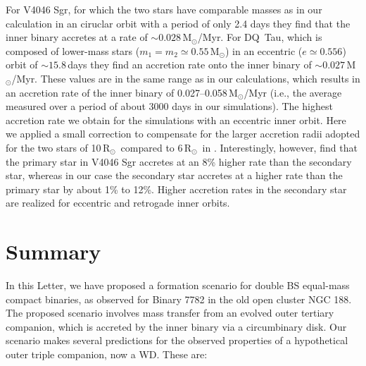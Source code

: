 \documentclass{aastex62}
\newcommand{\MSun}{\mbox{M$_\odot$}}
\newcommand{\RSun}{\mbox{R$_\odot$}}
\begin{document}
{For V4046 Sgr, for which the two stars have comparable masses as in
our calculation in an ciruclar orbit with a period of only 2.4 days
they find that the inner binary accretes at a rate of $\sim
0.028$\,\MSun/Myr.  For DQ~Tau, which is composed of lower-mass stars
($m_1 = m_2 \simeq 0.55$\,\MSun) in an eccentric ($e\simeq 0.556$)
orbit of $\sim 15.8$\,days they find an accretion rate onto the inner
binary of $\sim 0.027$\,\MSun/Myr.  These values are in the same range
as in our calculations, which results in an accretion rate of the inner
binary of 0.027--0.058\,\MSun/Myr (i.e., the average measured over a period of
about 3000 days in our simulations).  The highest accretion rate we obtain for the
simulations with an eccentric inner orbit.  Here we applied a small
correction to compensate for the larger accretion radii adopted for
the two stars of 10\,\RSun\, compared to 6\,\RSun\, in
\cite{2011MNRAS.413.2679D}. Interestingly, however,
\cite{2011MNRAS.413.2679D} find that the primary star in V4046 Sgr
accretes at an 8\% higher rate than the secondary star, whereas in our
case the secondary star accretes at a higher rate than the primary
star by about 1\% to 12\%.  Higher accretion rates in the secondary
star are realized for eccentric and retrogade inner orbits.



\section{Summary} \label{sect:conclusions}

In this Letter, we have proposed a formation scenario for double BS
equal-mass compact binaries, as observed for Binary 7782 in the old
open cluster NGC 188.  The proposed scenario involves mass transfer
from an evolved outer tertiary companion, which is accreted by the
inner binary via a circumbinary disk.  Our scenario makes several
predictions for the observed properties of a hypothetical outer triple
companion, now a WD.  These are:

\begin{enumerate}


\end{enumerate}}
\end{document}
